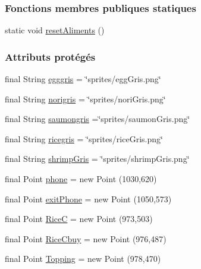 \subsubsection*{Fonctions membres publiques statiques}
\begin{DoxyCompactItemize}
\item 
static void \hyperlink{classTestSushi_1_1src_1_1Suchi_1_1Recette_aef7faa1aea5f8aeb869c612af16e4e62}{reset\+Aliments} ()
\end{DoxyCompactItemize}
\subsubsection*{Attributs protégés}
\begin{DoxyCompactItemize}
\item 
final String \hyperlink{classTestSushi_1_1src_1_1Suchi_1_1Recette_a14892e43d9ed57350effdf3ed1bddb8a}{egggris} = \char`\"{}sprites/egg\+Gris.\+png\char`\"{}
\item 
final String \hyperlink{classTestSushi_1_1src_1_1Suchi_1_1Recette_a774959efa525787a162778df37770b7c}{norigris} = \char`\"{}sprites/nori\+Gris.\+png\char`\"{}
\item 
final String \hyperlink{classTestSushi_1_1src_1_1Suchi_1_1Recette_aea59cc2a5f6bc21ec36690a5bf1eb38c}{saumongris} =\char`\"{}sprites/saumon\+Gris.\+png\char`\"{}
\item 
final String \hyperlink{classTestSushi_1_1src_1_1Suchi_1_1Recette_a616939eea675e05aa6d7ec62fd90f461}{ricegris} = \char`\"{}sprites/rice\+Gris.\+png\char`\"{}
\item 
final String \hyperlink{classTestSushi_1_1src_1_1Suchi_1_1Recette_ac1b1b9b91dba95a9d0df2f6e59f04a59}{shrimp\+Gris} = \char`\"{}sprites/shrimp\+Gris.\+png\char`\"{}
\item 
final Point \hyperlink{classTestSushi_1_1src_1_1Suchi_1_1Recette_a45e48b1a85957813f1a747df04923b08}{phone} = new Point (1030,620)
\item 
final Point \hyperlink{classTestSushi_1_1src_1_1Suchi_1_1Recette_aecc6de3619013f1fb5f506c1e4e9ad7b}{exit\+Phone} = new Point (1050,573)
\item 
final Point \hyperlink{classTestSushi_1_1src_1_1Suchi_1_1Recette_ab502e1d023a0bd3fadfc714e1babc728}{Rice\+C} = new Point (973,503)
\item 
final Point \hyperlink{classTestSushi_1_1src_1_1Suchi_1_1Recette_a890dce3bb5d54a700fa7bebc2496e931}{Rice\+Cbuy} = new Point (976,487)
\item 
final Point \hyperlink{classTestSushi_1_1src_1_1Suchi_1_1Recette_ab7575f64998864f6b053859c18380f58}{Topping} = new Point (978,470)

\end{DoxyCompactItemize}
